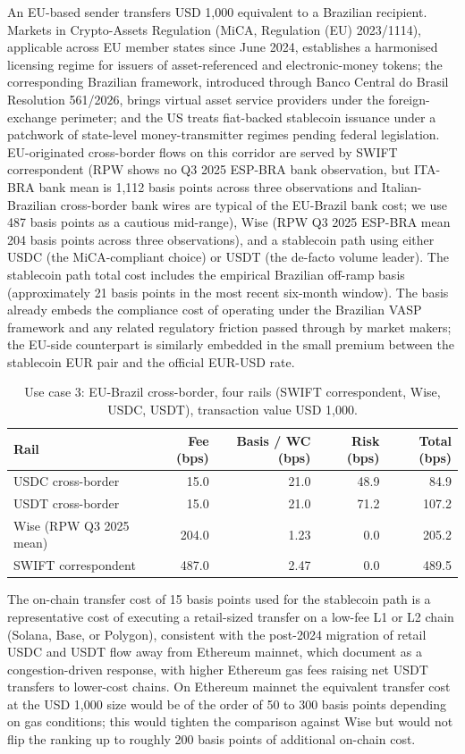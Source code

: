 An EU-based sender transfers USD 1,000 equivalent to a Brazilian recipient. Markets in Crypto-Assets Regulation (MiCA, Regulation (EU) 2023/1114), applicable across EU member states since June 2024, establishes a harmonised licensing regime for issuers of asset-referenced and electronic-money tokens; the corresponding Brazilian framework, introduced through Banco Central do Brasil Resolution 561/2026, brings virtual asset service providers under the foreign-exchange perimeter; and the US treats fiat-backed stablecoin issuance under a patchwork of state-level money-transmitter regimes pending federal legislation. EU-originated cross-border flows on this corridor are served by SWIFT correspondent (RPW shows no Q3 2025 ESP-BRA bank observation, but ITA-BRA bank mean is 1,112 basis points across three observations and Italian-Brazilian cross-border bank wires are typical of the EU-Brazil bank cost; we use 487 basis points as a cautious mid-range), Wise (RPW Q3 2025 ESP-BRA mean 204 basis points across three observations), and a stablecoin path using either USDC (the MiCA-compliant choice) or USDT (the de-facto volume leader). The stablecoin path total cost includes the empirical Brazilian off-ramp basis (approximately 21 basis points in the most recent six-month window). The basis already embeds the compliance cost of operating under the Brazilian VASP framework and any related regulatory friction passed through by market makers; the EU-side counterpart is similarly embedded in the small premium between the stablecoin EUR pair and the official EUR-USD rate.

\begin{table}[H]
\centering
\caption{Use case 3: EU-Brazil cross-border, four rails (SWIFT correspondent, Wise, USDC, USDT), transaction value USD 1,000.}\label{tab:uc3}
\begin{tabular}{lrrrr}
\toprule
Rail & Fee (bps) & Basis / WC (bps) & Risk (bps) & Total (bps) \\
\midrule
USDC cross-border               & 15.0  & 21.0 & 48.9 & 84.9  \\
USDT cross-border               & 15.0  & 21.0 & 71.2 & 107.2 \\
Wise (RPW Q3 2025 mean)         & 204.0 & 1.23 & 0.0  & 205.2 \\
SWIFT correspondent             & 487.0 & 2.47 & 0.0  & 489.5 \\
\bottomrule
\end{tabular}
\end{table}

The on-chain transfer cost of 15 basis points used for the stablecoin path is a representative cost of executing a retail-sized transfer on a low-fee L1 or L2 chain (Solana, Base, or Polygon), consistent with the post-2024 migration of retail USDC and USDT flow away from Ethereum mainnet, which \citet{klee_etal_2026_fragility} document as a congestion-driven response, with higher Ethereum gas fees raising net USDT transfers to lower-cost chains. On Ethereum mainnet the equivalent transfer cost at the USD 1,000 size would be of the order of 50 to 300 basis points depending on gas conditions; this would tighten the comparison against Wise but would not flip the ranking up to roughly 200 basis points of additional on-chain cost.


